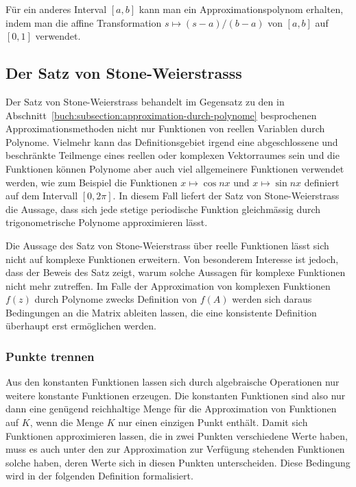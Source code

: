 Für ein anderes Interval $[a,b]$ kann man ein Approximationspolynom
erhalten, indem man die affine Transformation
$s\mapsto (s-a)/(b-a)$
von $[a,b]$ auf $[0,1]$
verwendet. 

%
%
\subsection{Der Satz von Stone-Weierstrasss
\label{buch:subsetion:stone-weierstrass}}
%
%
Der Satz von Stone-Weierstrass behandelt im Gegensatz zu den in
Abschnitt~\ref{buch:subsection:approximation-durch-polynome}
besprochenen Approximationsmethoden nicht nur Funktionen von
reellen Variablen durch Polynome.
Vielmehr kann das Definitionsgebiet irgend eine abgeschlossene
und beschränkte Teilmenge eines reellen oder komplexen Vektorraumes
sein und die Funktionen können Polynome aber auch viel allgemeinere
Funktionen verwendet werden, wie zum Beispiel die Funktionen
$x\mapsto \cos nx$ und $x\mapsto \sin nx$ definiert auf dem
Intervall $[0,2\pi]$.
In diesem Fall liefert der Satz von Stone-Weierstrass die Aussage,
dass sich jede stetige periodische Funktion gleichmässig durch
trigonometrische Polynome approximieren lässt.

Die Aussage des Satz von Stone-Weierstrass über reelle Funktionen
lässt sich nicht auf komplexe Funktionen erweitern.
Von besonderem Interesse ist jedoch, dass der Beweis des Satz 
zeigt, warum solche Aussagen für komplexe Funktionen nicht mehr
zutreffen.
Im Falle der Approximation von komplexen Funktionen $f(z)$ durch Polynome
zwecks Definition von $f(A)$ werden sich daraus Bedingungen an die
Matrix ableiten lassen, die eine konsistente Definition überhaupt
erst ermöglichen werden.

\subsubsection{Punkte trennen}
Aus den konstanten Funktionen lassen sich durch algebraische
Operationen nur weitere konstante Funktionen erzeugen.
Die konstanten Funktionen sind also nur dann eine genügend
reichhaltige Menge für die Approximation von Funktionen auf $K$,
wenn die Menge $K$ nur einen einzigen Punkt enthält.
Damit sich Funktionen approximieren lassen, die in zwei Punkten
verschiedene Werte haben, muss es auch unter den zur Approximation
zur Verfügung stehenden Funktionen solche haben, deren Werte sich
in diesen Punkten unterscheiden.
Diese Bedingung wird in der folgenden Definition formalisiert.

